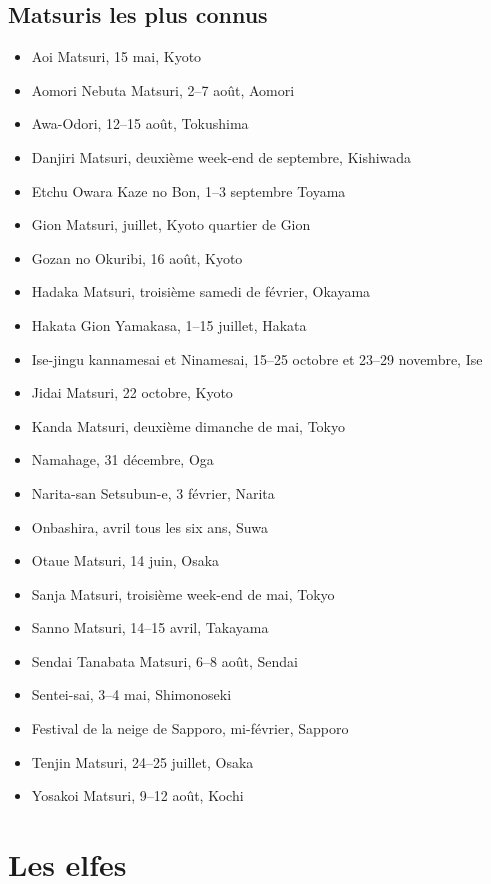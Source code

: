 \section{Matsuris les plus connus}

\begin{itemize}
	\item Aoi Matsuri, 15 mai, Kyoto
	\item Aomori Nebuta Matsuri, 2--7 août, Aomori
	\item Awa-Odori, 12--15 août, Tokushima
	\item Danjiri Matsuri, deuxième week-end de septembre, Kishiwada
	\item Etchu Owara Kaze no Bon, 1--3 septembre Toyama
	\item Gion Matsuri, juillet, Kyoto quartier de Gion
	\item Gozan no Okuribi, 16 août, Kyoto
	\item Hadaka Matsuri, troisième samedi de février, Okayama
	\item Hakata Gion Yamakasa, 1--15 juillet, Hakata
	\item Ise-jingu kannamesai et Ninamesai, 15--25 octobre et 23--29 novembre, Ise
	\item Jidai Matsuri, 22 octobre, Kyoto
	\item Kanda Matsuri, deuxième dimanche de mai, Tokyo
	\item Namahage, 31 décembre, Oga
	\item Narita-san Setsubun-e, 3 février, Narita
	\item Onbashira, avril tous les six ans, Suwa
	\item Otaue Matsuri, 14 juin, Osaka
	\item Sanja Matsuri, troisième week-end de mai, Tokyo
	\item Sanno Matsuri, 14--15 avril, Takayama
	\item Sendai Tanabata Matsuri, 6--8 août, Sendai
	\item Sentei-sai, 3--4 mai, Shimonoseki
	\item Festival de la neige de Sapporo, mi-février, Sapporo
	\item Tenjin Matsuri, 24--25 juillet, Osaka
	\item Yosakoi Matsuri, 9--12 août, Kochi
\end{itemize}

\chapter{Les elfes}
